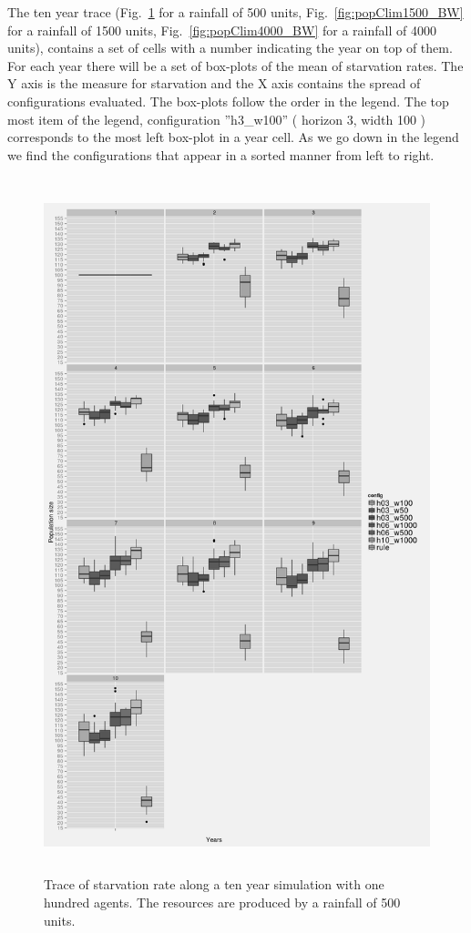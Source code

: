 \documentclass[11pt,oneside,a4paper,openright]{report}
\begin{document}

The ten year trace (Fig.~\ref{fig:popClim500_BW} for a rainfall of 500 units, Fig.~\ref{fig:popClim1500_BW} for a rainfall of 1500 units, Fig.~\ref{fig:popClim4000_BW} for a rainfall of 4000 units), contains a set of cells with a number indicating the year on top of them.
For each year there will be a set of box-plots of the mean of starvation rates. The Y axis is the measure for starvation and the X axis contains the spread of configurations evaluated. The box-plots follow the order in the legend.
The top most item of the legend, configuration ''h3\_w100'' ( horizon 3, width 100 ) corresponds to the most left box-plot in a year cell. As we go down in the legend we find the configurations that appear in a sorted manner from left to right. 

\begin{figure}[!htb]
\centering
\includegraphics[height=20.2cm]{figures/expm/popClim500_BW}
\caption{Trace of starvation rate along a ten year simulation with one hundred agents. The resources are produced by a rainfall of 500 units.}
\label{fig:popClim500_BW}
\end{figure}
\end{document}
